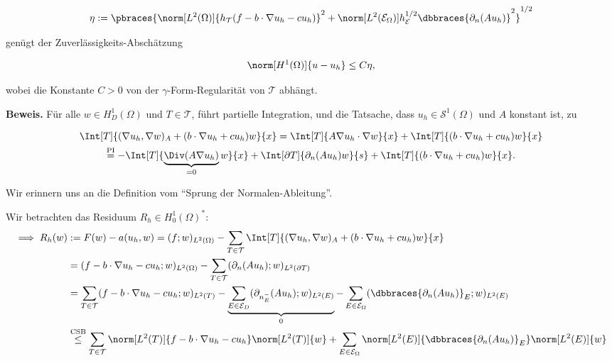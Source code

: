 \begin{solution}
\begin{enumerate}[label = \textbf{\alph*)}]
\begin{tcolorbox}[standard jigsaw, opacityback = 0]
    \begin{align*}
      \eta
      :=
      \pbraces
      {
        \norm[L^2(\Omega)]{h_\mathcal{T} (f - b \cdot \nabla u_h - c u_h)}^2
        +
        \norm[L^2(\mathcal{E}_\Omega)]{h_\mathcal{E}^{1/2} \dbbraces{\partial_n (A u_h)}}^2
      }^{1/2}
    \end{align*}

    genügt der Zuverlässigkeits-Abschätzung

    \begin{align*}
      \norm[H^1(\Omega)]{u - u_h}
      \leq
      C \eta,
    \end{align*}

    wobei die Konstante $C > 0$ von der $\gamma$-Form-Regularität von $\mathcal{T}$ abhängt.

  \end{tcolorbox}

  \textbf{Beweis.}
  Für alle $w \in H_D^1(\Omega)$ und $T \in \mathcal{T}$, führt partielle Integration, und die Tatsache, dass $u_h \in \mathcal{S}^1(\Omega)$ und $A$ konstant ist, zu

  \begin{multline*}
    \Int[T]{(\nabla u_h, \nabla w)_A + (b \cdot \nabla u_h + c u_h) w}{x}
    =
    \Int[T]{A \nabla u_h \cdot \nabla w}{x}
    +
    \Int[T]{(b \cdot \nabla u_h + c u_h) w}{x} \\
    \stackrel
    {
      \mathrm{PI}
    }{=}
    -\Int[T]
    {
      \underbrace
      {
        \Div(A \nabla u_h)
      }_{=0}
      w
    }{x}
    +
    \Int[\partial T]{\partial_n(A u_h) w}{s}
    +
    \Int[T]{(b \cdot \nabla u_h + c u_h) w}{x}.
  \end{multline*}

  Wir erinnern uns an die Definition vom \enquote{Sprung der Normalen-Ableitung}.


  Wir betrachten das Residuum $R_h \in H_0^1(\Omega)^*$:
  \begin{align*}
    \implies
    R_h(w)
    & :=
    F(w) - a(u_h, w)
    =
    (f; w)_{L^2(\Omega)}
    -
    \sum_{T \in \mathcal{T}}
    \Int[T]{(\nabla u_h, \nabla w)_A + (b \cdot \nabla u_h + c u_h) w}{x} \\
    & =
    (f - b \cdot \nabla u_h - c u_h; w)_{L^2(\Omega)}
    -
    \sum_{T \in \mathcal{T}}
    (\partial_n (A u_h); w)_{L^2(\partial T)} \\
    & =
    \sum_{T \in \mathcal{T}}
    (f - b \cdot \nabla u_h - c u_h; w)_{L^2(T)}
    -
    \underbrace
    {
      \sum_{E \in \mathcal{E}_D}
      (\partial_{n_E^-} (A u_h); w)_{L^2(E)}
    }_0
    -
    \sum_{E \in \mathcal{E}_\Omega}
    (\dbbraces{\partial_n (A u_h)}_E; w)_{L^2(E)} \\
    & \stackrel
    {
      \mathrm{CSB}
    }{\leq}
    \sum_{T \in \mathcal{T}}
    \norm[L^2(T)]{f - b \cdot \nabla u_h - c u_h}
    \norm[L^2(T)]{w}
    +
    \sum_{E \in \mathcal{E}_\Omega}
    \norm[L^2(E)]{\dbbraces{\partial_n(A u_h)}_E}
    \norm[L^2(E)]{w}
  \end{align*}


\end{enumerate}
\end{solution}
